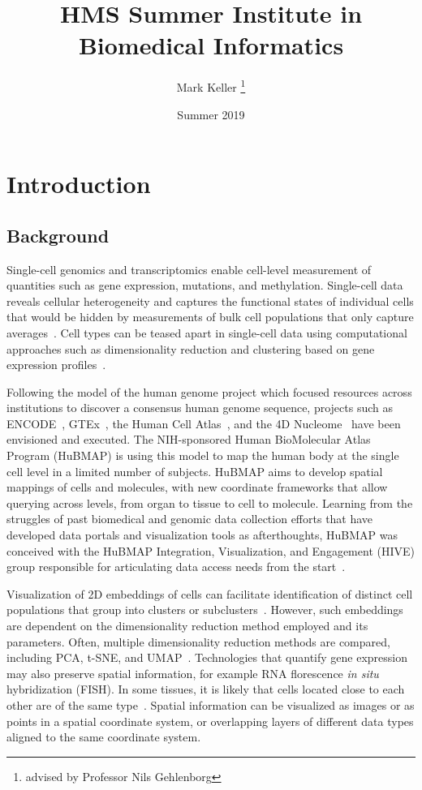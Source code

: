\documentclass[12pt, letterpaper]{article}
\title{HMS Summer Institute in Biomedical Informatics}
\author{Mark Keller \thanks{advised by Professor Nils Gehlenborg}}
\date{Summer 2019}
\begin{document}
\maketitle

\section{Introduction}
\subsection{Background}
Single-cell genomics and transcriptomics enable cell-level measurement of quantities such as gene expression, mutations, and methylation.
Single-cell data reveals cellular heterogeneity and captures the functional states of individual cells that would be hidden by measurements of bulk cell populations that only capture averages~\cite{shapiro2013single,nathan2019multimodal}.
Cell types can be teased apart in single-cell data using computational approaches such as dimensionality reduction and clustering based on gene expression profiles~\cite{stegle2015computational,burgess2019spatial}.

Following the model of the human genome project which focused resources across institutions to discover a consensus human genome sequence, projects such as ENCODE~\cite{encode2004encode}, GTEx~\cite{lonsdale2013genotype}, the Human Cell Atlas~\cite{regev2017science}, and the 4D Nucleome~\cite{dekker20174d} have been envisioned and executed.
The NIH-sponsored Human BioMolecular Atlas Program (HuBMAP) is using this model to map the human body at the single cell level in a limited number of subjects.
HuBMAP aims to develop spatial mappings of cells and molecules, with new coordinate frameworks that allow querying across levels, from organ to tissue to cell to molecule.
Learning from the struggles of past biomedical and genomic data collection efforts that have developed data portals and visualization tools as afterthoughts, HuBMAP was conceived with the HuBMAP Integration, Visualization, and Engagement (HIVE) group responsible for articulating data access needs from the start~\cite{snyder2019mapping}.

Visualization of 2D embeddings of cells can facilitate identification of distinct cell populations that group into clusters or subclusters~\cite{wang2017visualization,staahl2016visualization}.
However, such embeddings are dependent on the dimensionality reduction method employed and its parameters.
Often, multiple dimensionality reduction methods are compared, including PCA, t-SNE, and UMAP~\cite{ovchinnikova2019exploring,becht2019dimensionality}.
Technologies that quantify gene expression may also preserve spatial information, for example RNA florescence \textit{in situ} hybridization (FISH).
In some tissues, it is likely that cells located close to each other are of the same type~\cite{stegle2015computational}.
Spatial information can be visualized as images or as points in a spatial coordinate system, or overlapping layers of different data types aligned to the same coordinate system.
\end{document}
